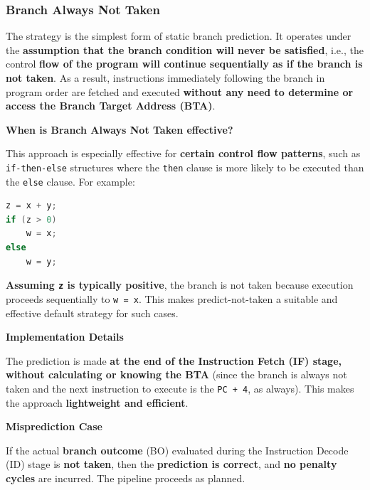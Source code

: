 \subsubsection{Branch Always Not Taken}

The  strategy is the simplest form of static branch prediction. It operates under the \textbf{assumption that the branch condition will never be satisfied}, i.e., the control \textbf{flow of the program will continue sequentially as if the branch is not taken}. As a result, instructions immediately following the branch in program order are fetched and executed \textbf{without any need to determine or access the Branch Target Address (BTA)}.

\highspace
\begin{flushleft}
    \textcolor{Green3}{ \textbf{When is Branch Always Not Taken effective?}}
\end{flushleft}
This approach is especially effective for \textbf{certain control flow patterns}, such as \texttt{if-then-else} structures where the \texttt{then} clause is more likely to be executed than the \texttt{else} clause. For example:
\begin{lstlisting}[language=c]
z = x + y;
if (z > 0)
    w = x;
else
    w = y;\end{lstlisting}
\textbf{Assuming \texttt{z} is typically positive}, the branch is not taken because execution proceeds sequentially to \texttt{w = x}. This makes predict-not-taken a suitable and effective default strategy for such cases.

\highspace
\begin{flushleft}
    \textcolor{Green3}{ \textbf{Implementation Details}}
\end{flushleft}
The prediction is made \textbf{at the end of the Instruction Fetch (IF) stage, without calculating or knowing the BTA} (since the branch is always not taken and the next instruction to execute is the \texttt{PC + 4}, as always). This makes the approach \textcolor{Green3}{\textbf{lightweight and efficient}}.

\highspace
\begin{flushleft}
    \textcolor{Red2}{ \textbf{Misprediction Case}}
\end{flushleft}
If the actual \textbf{branch outcome} (BO) evaluated during the Instruction Decode (ID) stage is \textbf{not taken}, then the \textbf{prediction is correct}, and \textbf{no penalty cycles} are incurred. The pipeline proceeds as planned.

